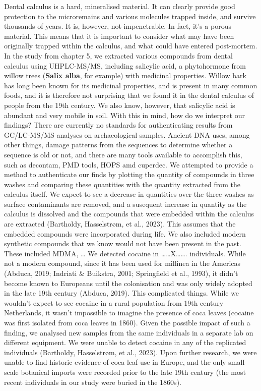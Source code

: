 \documentclass[
  letterpaper,
]{book}
\begin{document}
Dental calculus is a hard, mineralised material. It can clearly provide
good protection to the microremains and various molecules trapped
inside, and survive thousands of years. It is, however, not
impenetrable. In fact, it's a porous material. This means that it is
important to consider what may have been originally trapped within the
calculus, and what could have entered post-mortem. In the study from
chapter 5, we extracted various compounds from dental calculus using
UHPLC-MS/MS, including salicylic acid, a phytohormone from willow trees
(\textbf{Salix alba}, for example) with medicinal properties. Willow
bark has long been known for its medicinal properties, and is present in
many common foods, and it is therefore not surprising that we found it
in the dental calculus of people from the 19th century. We also know,
however, that salicylic acid is abundant and very mobile in soil. With
this in mind, how do we interpret our findings? There are currently no
standards for authenticating results from GC/LC-MS/MS analyses on
archaeological samples. Ancient DNA uses, among other things, damage
patterns from the sequences to determine whether a sequence is old or
not, and there are many tools available to accomplish this, such as
decontam, PMD tools, HOPS amd cuperdec. We attempted to provide a method
to authenticate our finds by plotting the quantity of compounds in three
washes and comparing these quantities with the quantity extracted from
the calculus itself. We expect to see a decrease in quantities over the
three washes as surface contaminants are removed, and a susequent
increase in quantity as the calculus is dissolved and the compounds that
were embedded within the calculus are extracted (Bartholdy, Hasselstrøm,
et al., 2023). This assumes that the embedded compounds were
incorporated during life. We also included modern synthetic compounds
that we know would not have been present in the past. These included
MDMA, \ldots{} We detected cocaine in \ldots\ldots X\ldots\ldots.
individuals. While not a modern compound, since it has been used for
millinea in the Americas (Abduca, 2019; Indriati \& Buikstra, 2001;
Springfield et al., 1993), it didn't become known to Europeans until the
colonisation and was only widely adopted in the late 19th century
(Abduca, 2019). This complicated things. While we wouldn't expect to see
cocaine in a rural population from 19th century Netherlands, it wasn't
impossible to imagine the presence of coca leaves (cocaine was first
isolated from coca leaves in 1860). Given the possible impact of such a
finding, we analysed new samples from the same individuals in a separate
lab on different equipment. We were unable to detect cocaine in any of
the replicated individuals (Bartholdy, Hasselstrøm, et al., 2023). Upon
further research, we were unable to find historic evidence of coca
leaf-use in Europe, and the only small-scale botanical imports were
recorded prior to the late 19th century (the most recent individuals in
our study were buried in the 1860s).
\end{document}
